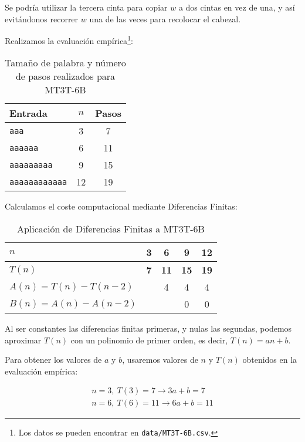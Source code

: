 Se podría utilizar la tercera cinta para copiar $w$ a dos cintas en vez de una, y así evitándonos recorrer $w$ una de las veces para recolocar el cabezal.


Realizamos la evaluación empírica\footnote{Los datos se pueden encontrar en \texttt{data/MT3T-6B.csv}.}:

\begin{table}[h]
    \centering
    \begin{tabular}{lcc}
        Entrada & $n$ & Pasos \\
        \hline
        \texttt{aaa}                &  3  &  7 \\
        \texttt{aaaaaa}             &  6  & 11 \\
        \texttt{aaaaaaaaa}          &  9  & 15 \\
        \texttt{aaaaaaaaaaaa}       & 12  & 19 \\
    \end{tabular}
    \caption{Tamaño de palabra y número de pasos realizados para MT3T-6B}
\end{table}

Calculamos el coste computacional mediante Diferencias Finitas:

\begin{table}[H]
    \centering
    \begin{tabular}{|l|c|c|c|c|}
        \hline
        $n$    & \textbf{3} & \textbf{6}  & \textbf{9}  & \textbf{12} \\ \hline
        $T(n)$ & \textbf{7} & \textbf{11} & \textbf{15} & \textbf{19} \\ \hline
        \hline
        $A(n) = T(n) - T(n-2)$ &   & 4 & 4 & 4 \\ \hline
        $B(n) = A(n) - A(n-2)$ &   &   & 0 & 0 \\ \hline
    \end{tabular}
    \caption{Aplicación de Diferencias Finitas a MT3T-6B}
\end{table}

Al ser constantes las diferencias finitas primeras, y nulas las segundas, podemos aproximar $T(n)$ con un polinomio de primer orden, es decir, $T(n) = an + b$.\medskip

Para obtener los valores de $a$ y $b$, usaremos valores de $n$ y $T(n)$ obtenidos en la evaluación empírica:

\begin{subequations}
    \begin{gather*}
        n = 3,\ T(3) = 7 \rightarrow 3a + b = 7 \\
        n = 6,\ T(6) = 11 \rightarrow 6a + b = 11
    \end{gather*}
\end{subequations}

